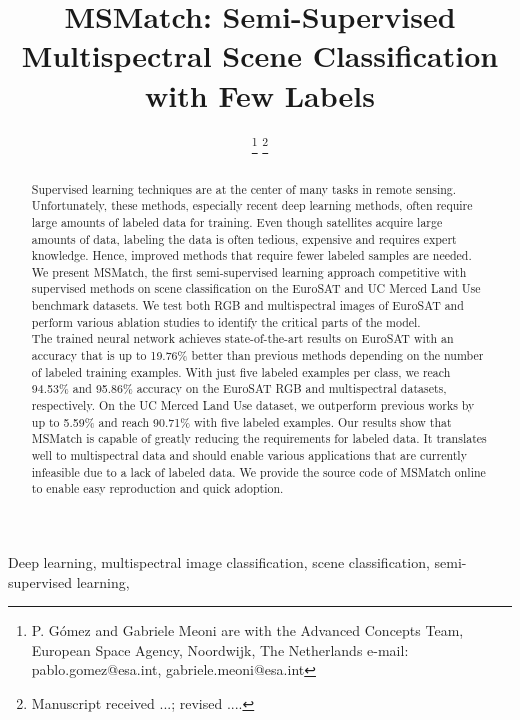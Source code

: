 \documentclass[journal]{IEEEtran}
\newcommand{\gomez}{G\'{o}mez}
\begin{document}
\title{MSMatch: Semi-Supervised Multispectral Scene Classification with Few Labels}

\author{\IEEEauthorblockN{Pablo \gomez\textsuperscript{*} and
Gabriele Meoni\textsuperscript{*}}\thanks{P. \gomez{} and Gabriele Meoni are with the Advanced Concepts Team, European Space Agency, Noordwijk, The Netherlands e-mail: pablo.gomez@esa.int, gabriele.meoni@esa.int}
\thanks{Manuscript received ...; revised .... }}



\maketitle

\begin{abstract}
Supervised learning techniques are at the center of many tasks in remote sensing. Unfortunately, these methods, especially recent deep learning methods, often require large amounts of labeled data for training. Even though satellites acquire large amounts of data, labeling the data is often tedious, expensive and requires expert knowledge. Hence, improved methods that require fewer labeled samples are needed. \\
We present MSMatch, the first semi-supervised learning approach competitive with supervised methods on scene classification on the EuroSAT and UC Merced Land Use benchmark datasets. We test both RGB and multispectral images of EuroSAT and perform various ablation studies to identify the critical parts of the model. \\
The trained neural network achieves state-of-the-art results on EuroSAT with an accuracy that is up to 19.76\% better than previous methods depending on the number of labeled training examples. With just five labeled examples per class, we reach 94.53\%  and 95.86\% accuracy on the EuroSAT RGB and multispectral datasets, respectively. On the UC Merced Land Use dataset, we outperform previous works by up to 5.59\%  and reach 90.71\% with five labeled examples.
Our results show that MSMatch is capable of greatly reducing the requirements for labeled data. It translates well to multispectral data and should enable various applications that are currently infeasible due to a lack of labeled data. We provide the source code of MSMatch online to enable easy reproduction and quick adoption.
\end{abstract}

\begin{IEEEkeywords}
Deep learning, multispectral image classification, scene classification, semi-supervised learning, 
\end{IEEEkeywords}
\end{document}

